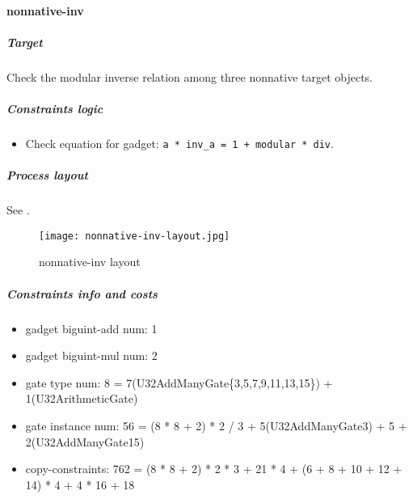 \paragraph{nonnative-inv}

\subparagraph{Target}
Check the modular inverse relation among three nonnative target objects.

\subparagraph{Constraints logic}
\begin{itemize}
    \item Check equation for gadget: \verb|a * inv_a = 1 + modular * div|.
\end{itemize}

\subparagraph{Process layout}
See .
\begin{figure}[!ht]
    \centering
    \texttt{[image: nonnative-inv-layout.jpg]}
    \caption{nonnative-inv layout}
    \label{fig:nonnative-inv-layout}
\end{figure}

\subparagraph{Constraints info and costs}
\begin{itemize}
    \item gadget biguint-add num: 1
    \item gadget biguint-mul num: 2
    \item gate type num: 8 = 7(U32AddManyGate\{3,5,7,9,11,13,15\}) + 1(U32ArithmeticGate)
    \item gate instance num: 56 = (8 * 8 + 2) * 2 / 3 + 5(U32AddManyGate{3}) + 5 + 2(U32AddManyGate{15})
    \item copy-constraints: 762 = (8 * 8 + 2) * 2 * 3 + 21 * 4 + (6 + 8 + 10 + 12 + 14) * 4 + 4 * 16 + 18
\end{itemize}
